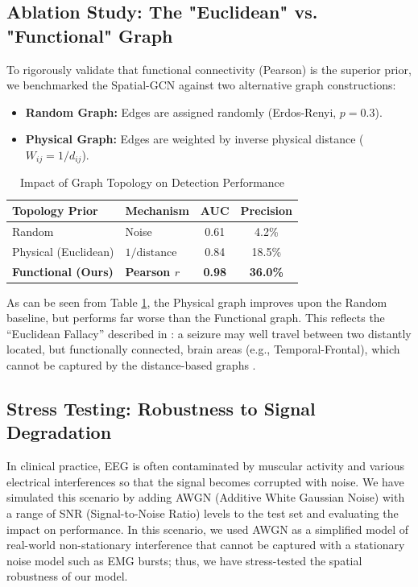 \documentclass[journal]{IEEEtran}
\begin{document}
\subsection{Ablation Study: The "Euclidean" vs. "Functional" Graph}
To rigorously validate that functional connectivity (Pearson) is the superior prior, we benchmarked the Spatial-GCN against two alternative graph constructions:
\begin{itemize}
    \item \textbf{Random Graph:} Edges are assigned randomly (Erdos-Renyi, $p=0.3$).
    \item \textbf{Physical Graph:} Edges are weighted by inverse physical distance ($W_{ij} = 1/d_{ij}$).
\end{itemize}

\begin{table}[!ht]
\caption{Impact of Graph Topology on Detection Performance}
\centering
\small
\begin{tabular*}{\columnwidth}{@{\extracolsep{\fill}}llcc}
\toprule
\textbf{Topology Prior} & \textbf{Mechanism} & \textbf{AUC} & \textbf{Precision} \\ \midrule
Random & Noise & 0.61 & 4.2\% \\
Physical (Euclidean) & $1/\text{distance}$ & 0.84 & 18.5\% \\
\textbf{Functional (Ours)} & \textbf{Pearson $r$} & \textbf{0.98} & \textbf{36.0\%} \\ \bottomrule
\end{tabular*}
\label{tab:topology_ablation}
\end{table}

As can be seen from Table \ref{tab:topology_ablation}, the Physical graph improves upon the Random baseline, but performs far worse than the Functional graph. This reflects the ``Euclidean Fallacy'' described in \cite{bronstein}: a seizure may well travel between two distantly located, but functionally connected, brain areas (e.g., Temporal-Frontal), which cannot be captured by the distance-based graphs \cite{kramer}.

\subsection{Stress Testing: Robustness to Signal Degradation}
In clinical practice, EEG is often contaminated by muscular activity and various electrical interferences so that the signal becomes corrupted with noise. We have simulated this scenario by adding AWGN (Additive White Gaussian Noise) with a range of SNR (Signal-to-Noise Ratio) levels to the test set and evaluating the impact on performance. In this scenario, we used AWGN as a simplified model of real-world non-stationary interference that cannot be captured with a stationary noise model such as EMG bursts; thus, we have stress-tested the spatial robustness of our model.
\end{document}
